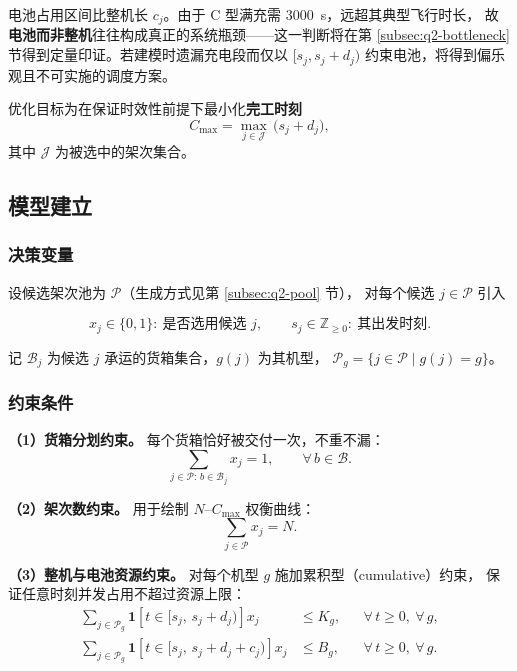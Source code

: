 电池占用区间比整机长 $c_j$。由于 C 型满充需 $3000$~s，远超其典型飞行时长，
故\textbf{电池而非整机}往往构成真正的系统瓶颈——这一判断将在第
\ref{subsec:q2-bottleneck} 节得到定量印证。若建模时遗漏充电段而仅以
$[s_j,s_j+d_j)$ 约束电池，将得到偏乐观且不可实施的调度方案。

优化目标为在保证时效性前提下最小化\textbf{完工时刻}
\begin{equation}
  C_{\max}=\max_{j\in\mathcal{J}}\,\bigl(s_j+d_j\bigr),
\end{equation}
其中 $\mathcal{J}$ 为被选中的架次集合。

\subsection{模型建立}

\subsubsection{决策变量}

设候选架次池为 $\mathcal{P}$（生成方式见第 \ref{subsec:q2-pool} 节），
对每个候选 $j\in\mathcal{P}$ 引入

\begin{equation}
  x_j\in\{0,1\}:\ \text{是否选用候选 } j,
  \qquad
  s_j\in\mathbb{Z}_{\ge 0}:\ \text{其出发时刻} .
\end{equation}

记 $\mathcal{B}_j$ 为候选 $j$ 承运的货箱集合，$g(j)$ 为其机型，
$\mathcal{P}_g=\{j\in\mathcal{P}\mid g(j)=g\}$。

\subsubsection{约束条件}

\textbf{（1）货箱分划约束。} 每个货箱恰好被交付一次，不重不漏：
\begin{equation}
  \sum_{j\in\mathcal{P}:\,b\in\mathcal{B}_j} x_j = 1,
  \qquad \forall\,b\in\mathcal{B} .
  \label{eq:q2-cover}
\end{equation}

\textbf{（2）架次数约束。} 用于绘制 $N$--$C_{\max}$ 权衡曲线：
\begin{equation}
  \sum_{j\in\mathcal{P}} x_j = N .
\end{equation}

\textbf{（3）整机与电池资源约束。} 对每个机型 $g$ 施加累积型（cumulative）约束，
保证任意时刻并发占用不超过资源上限：
\begin{align}
  \sum_{j\in\mathcal{P}_g}\mathbf{1}\!\left[t\in[s_j,\,s_j+d_j)\right]x_j
    &\le K_g, &&\forall\,t\ge 0,\ \forall\,g, \\
  \sum_{j\in\mathcal{P}_g}\mathbf{1}\!\left[t\in[s_j,\,s_j+d_j+c_j)\right]x_j
    &\le B_g, &&\forall\,t\ge 0,\ \forall\,g .
  \label{eq:q2-cumul}
\end{align}

